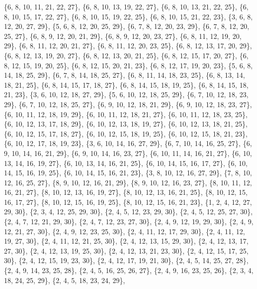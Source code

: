 \documentclass[11pt,a4paper]{article}
\begin{document}
{\{6, 8, 10, 11, 21, 22, 27\}, \{6, 8, 10, 13, 19, 22, 27\}, \{6, 8, 10, 13, 21, 22, 25\}, \{6, 8, 10, 15, 17, 22, 27\}, \{6, 8, 10, 15, 19, 22, 25\},
\{6, 8, 10, 15, 21, 22, 23\}, \{3, 6, 8, 12, 20, 27, 29\}, \{5, 6, 8, 12, 20, 25, 29\}, \{6, 7, 8, 12, 20, 23, 29\}, \{6, 7, 8, 12, 20, 25, 27\},
\{6, 8, 9, 12, 20, 21, 29\}, \{6, 8, 9, 12, 20, 23, 27\}, \{6, 8, 11, 12, 19, 20, 29\}, \{6, 8, 11, 12, 20, 21, 27\}, \{6, 8, 11, 12, 20, 23, 25\},
\{6, 8, 12, 13, 17, 20, 29\}, \{6, 8, 12, 13, 19, 20, 27\}, \{6, 8, 12, 13, 20, 21, 25\}, \{6, 8, 12, 15, 17, 20, 27\}, \{6, 8, 12, 15, 19, 20, 25\},
\{6, 8, 12, 15, 20, 21, 23\}, \{6, 8, 12, 17, 19, 20, 23\}, \{5, 6, 8, 14, 18, 25, 29\}, \{6, 7, 8, 14, 18, 25, 27\}, \{6, 8, 11, 14, 18, 23, 25\},
\{6, 8, 13, 14, 18, 21, 25\}, \{6, 8, 14, 15, 17, 18, 27\}, \{6, 8, 14, 15, 18, 19, 25\}, \{6, 8, 14, 15, 18, 21, 23\}, \{3, 6, 10, 12, 18, 27, 29\},
\{5, 6, 10, 12, 18, 25, 29\}, \{6, 7, 10, 12, 18, 23, 29\}, \{6, 7, 10, 12, 18, 25, 27\}, \{6, 9, 10, 12, 18, 21, 29\}, \{6, 9, 10, 12, 18, 23, 27\},
\{6, 10, 11, 12, 18, 19, 29\}, \{6, 10, 11, 12, 18, 21, 27\}, \{6, 10, 11, 12, 18, 23, 25\}, \{6, 10, 12, 13, 17, 18, 29\}, \{6, 10, 12, 13, 18, 19, 27\},
\{6, 10, 12, 13, 18, 21, 25\}, \{6, 10, 12, 15, 17, 18, 27\}, \{6, 10, 12, 15, 18, 19, 25\}, \{6, 10, 12, 15, 18, 21, 23\}, \{6, 10, 12, 17, 18, 19, 23\},
\{3, 6, 10, 14, 16, 27, 29\}, \{6, 7, 10, 14, 16, 25, 27\}, \{6, 9, 10, 14, 16, 21, 29\}, \{6, 9, 10, 14, 16, 23, 27\}, \{6, 10, 11, 14, 16, 21, 27\},
\{6, 10, 13, 14, 16, 19, 27\}, \{6, 10, 13, 14, 16, 21, 25\}, \{6, 10, 14, 15, 16, 17, 27\}, \{6, 10, 14, 15, 16, 19, 25\}, \{6, 10, 14, 15, 16, 21, 23\},
\{3, 8, 10, 12, 16, 27, 29\}, \{7, 8, 10, 12, 16, 25, 27\}, \{8, 9, 10, 12, 16, 21, 29\}, \{8, 9, 10, 12, 16, 23, 27\}, \{8, 10, 11, 12, 16, 21, 27\},
\{8, 10, 12, 13, 16, 19, 27\}, \{8, 10, 12, 13, 16, 21, 25\}, \{8, 10, 12, 15, 16, 17, 27\}, \{8, 10, 12, 15, 16, 19, 25\}, \{8, 10, 12, 15, 16, 21, 23\},
\{1, 2, 4, 12, 27, 29, 30\}, \{2, 3, 4, 12, 25, 29, 30\}, \{2, 4, 5, 12, 23, 29, 30\}, \{2, 4, 5, 12, 25, 27, 30\}, \{2, 4, 7, 12, 21, 29, 30\},
\{2, 4, 7, 12, 23, 27, 30\}, \{2, 4, 9, 12, 19, 29, 30\}, \{2, 4, 9, 12, 21, 27, 30\}, \{2, 4, 9, 12, 23, 25, 30\}, \{2, 4, 11, 12, 17, 29, 30\},
\{2, 4, 11, 12, 19, 27, 30\}, \{2, 4, 11, 12, 21, 25, 30\}, \{2, 4, 12, 13, 15, 29, 30\}, \{2, 4, 12, 13, 17, 27, 30\}, \{2, 4, 12, 13, 19, 25, 30\},
\{2, 4, 12, 13, 21, 23, 30\}, \{2, 4, 12, 15, 17, 25, 30\}, \{2, 4, 12, 15, 19, 23, 30\}, \{2, 4, 12, 17, 19, 21, 30\}, \{2, 4, 5, 14, 25, 27, 28\},
\{2, 4, 9, 14, 23, 25, 28\}, \{2, 4, 5, 16, 25, 26, 27\}, \{2, 4, 9, 16, 23, 25, 26\}, \{2, 3, 4, 18, 24, 25, 29\}, \{2, 4, 5, 18, 23, 24, 29\},
}
\end{document}
